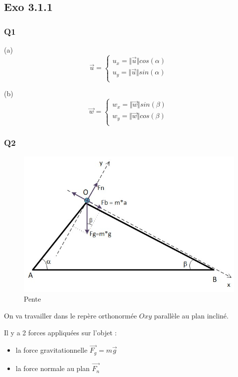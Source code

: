 \documentclass[]{book}
\theoremstyle{definition}
\begin{document}
\subsection*{Exo 3.1.1}
\subsubsection*{Q1}
(a) $$\overrightarrow{u} = 
\left\{ 
\begin{array}{l}
u_x = \Vert \overrightarrow{u} \Vert cos(\alpha) \\
u_y = \Vert \overrightarrow{u} \Vert sin(\alpha) \\
\end{array}
\right. 
$$

(b)
$$\overrightarrow{w} = 
\left\{ 
\begin{array}{l}
w_x = \Vert \overrightarrow{w} \Vert sin(\beta) \\
w_y = \Vert \overrightarrow{w} \Vert cos(\beta) \\
\end{array}
\right. 
$$

\subsubsection*{Q2}
\begin{figure}[h!]
  \includegraphics[width=0.8\linewidth]{exo3_1_1_pente.jpg}
  \caption{Pente}
\end{figure}

On va travailler dans le rep\`ere orthonorm\'ee $Oxy$ parall\`ele au plan inclin\'e.

Il y a 2 forces appliqu\'ees sur l'objet :
\begin{itemize}
\item la force gravitationnelle $\overrightarrow{F_g} = m\overrightarrow{g}$
\item la force normale au plan $\overrightarrow{F_n}$ 
\end{itemize}
\end{document}
